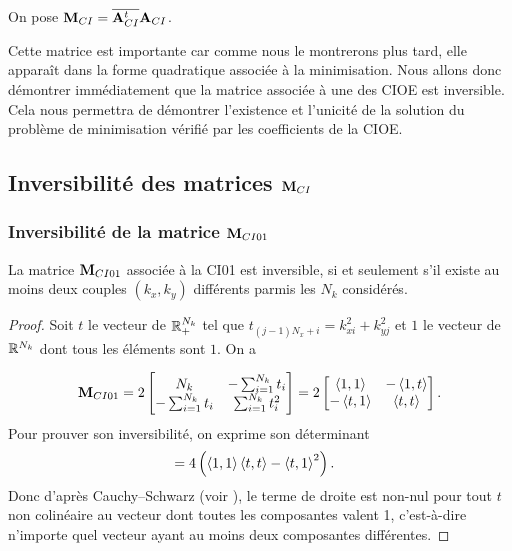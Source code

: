     \begin{defn}
      On pose \(\mathbf{M}_{CI}={\overline{\mathbf{A}_{CI}^t}}{\mathbf{A}_{CI}}\).
    \end{defn}

    Cette matrice est importante car comme nous le montrerons plus tard, elle apparaît dans la forme quadratique associée à la minimisation.
    Nous allons donc démontrer immédiatement que la matrice associée à une des CIOE est inversible.
    Cela nous permettra de démontrer l’existence et l'unicité de la solution du problème de minimisation vérifié par les coefficients de la CIOE.

  \subsection[Inversibilité des matrices Mci]{Inversibilité des matrices \(\mathbf{M}_{CI}\)}

    \subsubsection[Inversibilité de la matrice MCI01]{Inversibilité de la matrice \(\mathbf{M}_{CI01}\)}

      \begin{prop}
        La matrice \({\mathbf{M}}_{CI01}\)
        associée à la CI01 est inversible, si et seulement s'il existe au moins deux couples \((k_{x},k_{y})\) différents parmis les \(N_k\) considérés.
      \end{prop}

      \begin{proof}
        Soit \(t\) le vecteur de \(\mathbb R_+^{N_{k}}\) tel que \(t_{(j-1)N_x+i} = k_{xi}^2 + k_{yj}^2\) et \(1\) le vecteur de \(\mathbb R^{N_{k}}\) dont tous les éléments sont \(1\). On a

        \begin{equation*}
          {\mathbf{M}}_{CI01} = 2\begin{bmatrix}
          N_{k} & -\sum_{i=1}^{N_{k}} t_i
          \\
          -\sum_{i=1}^{N_{k}} t_i & \sum_{i=1}^{N_{k}} t_i^2
          \end{bmatrix}
          = 2\begin{bmatrix}
          \left<{1},{1}\right> & -\left<{1},{t}\right>
          \\
          -\left<{t},{1}\right> & \left<{t},{t}\right>
          \end{bmatrix}.
        \end{equation*}
        Pour prouver son inversibilité, on exprime son déterminant 
        \begin{align*}
           &= 4\left( \left<{1},{1}\right>\left<{t},{t}\right> - \left<{t},{1}\right>^2\right).
        \end{align*}
        Donc d'après Cauchy–Schwarz (voir \cite[\href{https://dlmf.nist.gov/1.7\#E1}{eq.~1.7.1}]{dlmf_nist_2019}), le terme de droite est non-nul pour tout \(t\) non colinéaire au vecteur dont toutes les composantes valent 1, c'est-à-dire n'importe quel vecteur ayant au moins deux composantes différentes.
      \end{proof}

